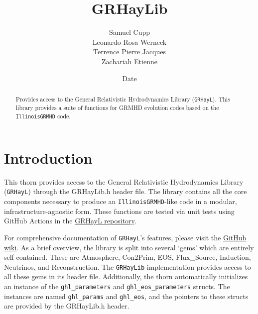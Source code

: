 \documentclass{article}
\begin{document}
\title{GRHayLib}
\author{Samuel Cupp \\ Leonardo Rosa Werneck \\ Terrence Pierre Jacques \\ Zachariah Etienne}
\date{$ $Date$ $}

\maketitle


\newcommand{\grhayl}{\texttt{GRHayL}}
\newcommand{\glib}{\texttt{GRHayLib}}
\newcommand{\igm}{\texttt{IllinoisGRMHD}}
\newcommand{\hydrobase}{\texttt{HydroBase}}

\begin{abstract}
Provides access to the General Relativistic Hydrodynamics
Library (\grhayl). This library provides a suite of functions
for GRMHD evolution codes based on the \igm{} code.
\end{abstract}

\section{Introduction}

This thorn provides access to the General Relativistic
Hydrodynamics Library (\grhayl) through the GRHayLib.h
header file. The library contains all the core components
necessary to produce an \igm-like code in a modular,
infrastructure-agnostic form. These functions are tested
via unit tests using GitHub Actions in the
\href{https://github.com/GRHayL/GRHayL}{GRHayL repository}.

For comprehensive documentation of \grhayl's features, please
visit the \href{https://github.com/GRHayL/GRHayL/wiki}{GitHub wiki}.
As a brief overview, the library is split into several `gems'
which are entirely self-contained. These are Atmosphere, Con2Prim,
EOS, Flux\_Source, Induction, Neutrinos, and Reconstruction.
The \glib{} implementation provides access to all these gems in its
header file. Additionally, the thorn automatically initializes an
instance of the \texttt{ghl\_parameters} and \texttt{ghl\_eos\_parameters}
structs. The instances are named \texttt{ghl\_params} and \texttt{ghl\_eos},
and the pointers to these structs are provided by the GRHayLib.h
header.
\end{document}
